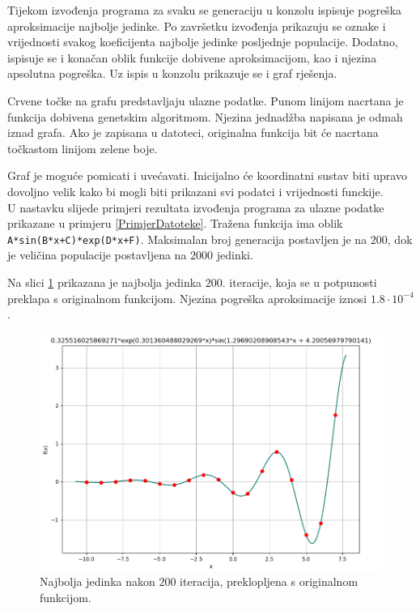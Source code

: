 \documentclass[times, utf8, seminar, numeric]{fer}
\begin{document}
Tijekom izvođenja programa za svaku se generaciju u konzolu ispisuje pogreška aproksimacije najbolje jedinke.
Po završetku izvođenja prikazuju se oznake i vrijednosti svakog koeficijenta najbolje jedinke posljednje populacije.
Dodatno, ispisuje se i konačan oblik funkcije dobivene aproksimacijom, kao i njezina apsolutna pogreška.
Uz ispis u konzolu prikazuje se i graf rješenja.

Crvene točke na grafu predstavljaju ulazne podatke.
Punom linijom nacrtana je funkcija dobivena genetskim algoritmom.
Njezina jednadžba napisana je odmah iznad grafa.
Ako je zapisana u datoteci, originalna funkcija bit će nacrtana točkastom linijom zelene boje.

Graf je moguće pomicati i uvećavati.
Inicijalno će koordinatni sustav biti upravo dovoljno velik kako bi mogli biti prikazani svi podatci i vrijednosti funckije.\\

U nastavku slijede primjeri rezultata izvođenja programa za ulazne podatke prikazane u primjeru \ref{PrimjerDatoteke}.
Tražena funkcija ima oblik \texttt{A*sin(B*x+C)*exp(D*x+F)}.
Maksimalan broj generacija postavljen je na $200$, dok je veličina populacije postavljena na $2000$ jedinki.

Na slici \ref{Graph_GoodFreq} prikazana je najbolja jedinka $200.$ iteracije, koja se u potpunosti preklapa s originalnom funkcijom.
Njezina pogreška aproksimacije iznosi $1.8\cdot 10^{-4}$.

\begin{figure}[h]
	\centering
	\includegraphics[width=1\textwidth]{figures/Graph_GoodFreq.png}
	\caption{\label{Graph_GoodFreq}Najbolja jedinka nakon $200$ iteracija, preklopljena s originalnom funkcijom.}
\end{figure}
\end{document}
